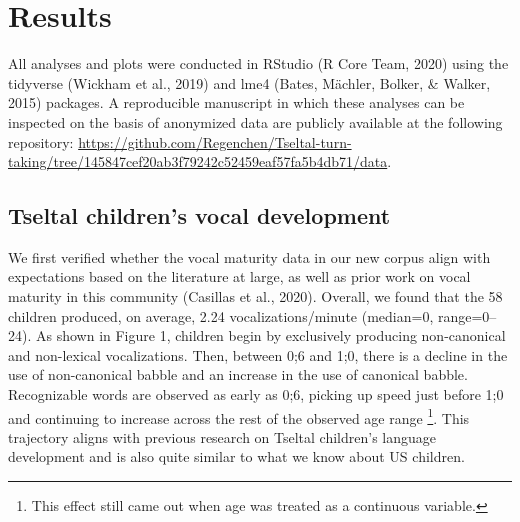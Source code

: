 \documentclass[
  man]{apa6}
\begin{document}
\hypertarget{results}{%
\section{Results}\label{results}}

All analyses and plots were conducted in RStudio (R Core Team, 2020) using the tidyverse (Wickham et al., 2019) and lme4 (Bates, Mächler, Bolker, \& Walker, 2015) packages. A reproducible manuscript in which these analyses can be inspected on the basis of anonymized data are publicly available at the following repository: \url{https://github.com/Regenchen/Tseltal-turn-taking/tree/145847cef20ab3f79242c52459eaf57fa5b4db71/data}.

\hypertarget{tseltal-childrens-vocal-development}{%
\subsection{Tseltal children's vocal development}\label{tseltal-childrens-vocal-development}}

We first verified whether the vocal maturity data in our new corpus align with expectations based on the literature at large, as well as prior work on vocal maturity in this community (Casillas et al., 2020). Overall, we found that the 58 children produced, on average, 2.24 vocalizations/minute (median=0, range=0--24). As shown in Figure 1, children begin by exclusively producing non-canonical and non-lexical vocalizations. Then, between 0;6 and 1;0, there is a decline in the use of non-canonical babble and an increase in the use of canonical babble. Recognizable words are observed as early as 0;6, picking up speed just before 1;0 and continuing to increase across the rest of the observed age range \footnote{This effect still came out when age was treated as a continuous variable.}. This trajectory aligns with previous research on Tseltal children's language development and is also quite similar to what we know about US children.
\end{document}
